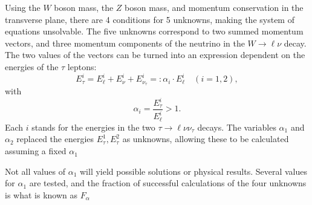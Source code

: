 Using the $W$ boson mass, the $Z$ boson mass, and momentum conservation in the transverse plane, there are 4 conditions for 5 unknowns, making the system of equations unsolvable. The five unknowns correspond to two summed momentum vectors, and three momentum components of the neutrino in the $W \to \ell\nu$ decay. The two values of the vectors can be turned into an expression dependent on the energies of the $\tau$ leptons:
\begin{equation}
  E_{\tau}^{i} = E_{\ell}^{i} + E_{\nu}^{i} + E_{\nu_{\tau}}^{i} =: \alpha_{i} \cdot E_{\ell}^{i} \quad (i = 1,2) ,
\end{equation}
with
\begin{equation}
  \alpha_{i} = \frac{E_{\tau}^{i}}{E_{\ell}^{i}} > 1.
\end{equation}
Each $i$ stands for the energies in the two $\tau \to \ell\nu\nu_{\tau}$ decays. The variables $\alpha_{1}$ and $\alpha_{2}$ replaced the energies $E_{\tau}^{1}, E_{\tau}^{2}$ as unknowns, allowing these to be calculated assuming a fixed $\alpha_{1}$

Not all values of $\alpha_{1}$ will yield possible solutions or physical results. Several values for $\alpha_{1}$ are tested, and the fraction of successful calculations of the four unknowns is what is known as $F_{\alpha}$
